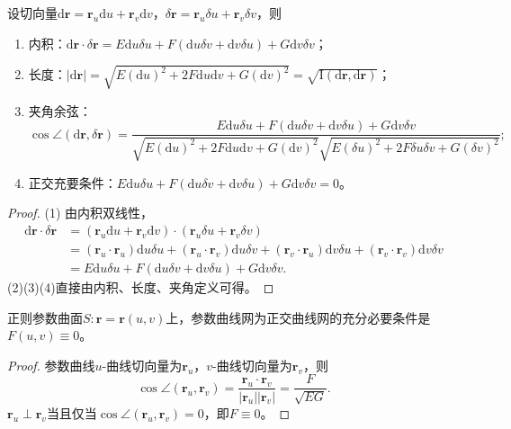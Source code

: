 \documentclass[../../main.tex]{subfiles}%
\begin{document}
\begin{proposition}
设切向量$\mathrm{d}\boldsymbol{r}=\boldsymbol{r}_u\mathrm{d}u+\boldsymbol{r}_v\mathrm{d}v$，$\delta\boldsymbol{r}=\boldsymbol{r}_u\delta u+\boldsymbol{r}_v\delta v$，则
\begin{enumerate}[(1)]
\item 内积：$\mathrm{d}\boldsymbol{r}\cdot\delta\boldsymbol{r}=E\mathrm{d}u\delta u+F(\mathrm{d}u\delta v+\mathrm{d}v\delta u)+G\mathrm{d}v\delta v$；
\item 长度：$|\mathrm{d}\boldsymbol{r}|=\sqrt{E(\mathrm{d}u)^2+2F\mathrm{d}u\mathrm{d}v+G(\mathrm{d}v)^2}=\sqrt{\mathrm{I}(\mathrm{d}\boldsymbol{r},\mathrm{d}\boldsymbol{r})}$；
\item 夹角余弦：
\[
\cos\angle(\mathrm{d}\boldsymbol{r},\delta\boldsymbol{r})=\frac{E\mathrm{d}u\delta u+F(\mathrm{d}u\delta v+\mathrm{d}v\delta u)+G\mathrm{d}v\delta v}{\sqrt{E(\mathrm{d}u)^2+2F\mathrm{d}u\mathrm{d}v+G(\mathrm{d}v)^2}\sqrt{E(\delta u)^2+2F\delta u\delta v+G(\delta v)^2}};
\]
\item 正交充要条件：$E\mathrm{d}u\delta u+F(\mathrm{d}u\delta v+\mathrm{d}v\delta u)+G\mathrm{d}v\delta v=0$。
\end{enumerate}
\end{proposition}
\begin{proof}
(1) 由内积双线性，
\begin{align*}
\mathrm{d}\boldsymbol{r}\cdot\delta\boldsymbol{r}
&=(\boldsymbol{r}_u\mathrm{d}u+\boldsymbol{r}_v\mathrm{d}v)\cdot(\boldsymbol{r}_u\delta u+\boldsymbol{r}_v\delta v)\\
&=(\boldsymbol{r}_u\cdot\boldsymbol{r}_u)\mathrm{d}u\delta u+(\boldsymbol{r}_u\cdot\boldsymbol{r}_v)\mathrm{d}u\delta v+(\boldsymbol{r}_v\cdot\boldsymbol{r}_u)\mathrm{d}v\delta u+(\boldsymbol{r}_v\cdot\boldsymbol{r}_v)\mathrm{d}v\delta v\\
&=E\mathrm{d}u\delta u+F(\mathrm{d}u\delta v+\mathrm{d}v\delta u)+G\mathrm{d}v\delta v.
\end{align*}
(2)(3)(4)直接由内积、长度、夹角定义可得。
\end{proof}

\begin{theorem}
正则参数曲面$S:\boldsymbol{r}=\boldsymbol{r}(u,v)$上，参数曲线网为正交曲线网的充分必要条件是$F(u,v)\equiv0$。
\end{theorem}
\begin{proof}
参数曲线$u$-曲线切向量为$\boldsymbol{r}_u$，$v$-曲线切向量为$\boldsymbol{r}_v$，则
\[
\cos\angle(\boldsymbol{r}_u,\boldsymbol{r}_v)=\frac{\boldsymbol{r}_u\cdot\boldsymbol{r}_v}{|\boldsymbol{r}_u||\boldsymbol{r}_v|}=\frac{F}{\sqrt{EG}}.
\]
$\boldsymbol{r}_u\perp\boldsymbol{r}_v$当且仅当$\cos\angle(\boldsymbol{r}_u,\boldsymbol{r}_v)=0$，即$F\equiv0$。
\end{proof}
\end{document}

